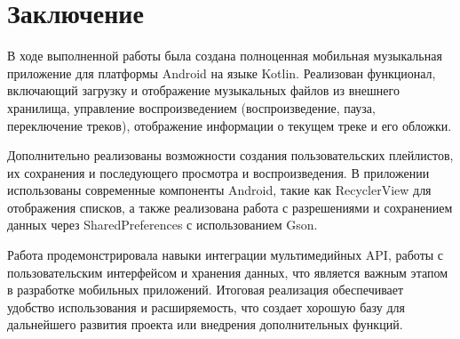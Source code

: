 \chapter{Заключение}

В ходе выполненной работы была создана полноценная мобильная музыкальная приложение для платформы Android на языке Kotlin. Реализован функционал, включающий загрузку и отображение музыкальных файлов из внешнего хранилища, управление воспроизведением (воспроизведение, пауза, переключение треков), отображение информации о текущем треке и его обложки.

Дополнительно реализованы возможности создания пользовательских плейлистов, их сохранения и последующего просмотра и воспроизведения. В приложении использованы современные компоненты Android, такие как RecyclerView для отображения списков, а также реализована работа с разрешениями и сохранением данных через SharedPreferences с использованием Gson.

Работа продемонстрировала навыки интеграции мультимедийных API, работы с пользовательским интерфейсом и хранения данных, что является важным этапом в разработке мобильных приложений. Итоговая реализация обеспечивает удобство использования и расширяемость, что создает хорошую базу для дальнейшего развития проекта или внедрения дополнительных функций.

\endinput